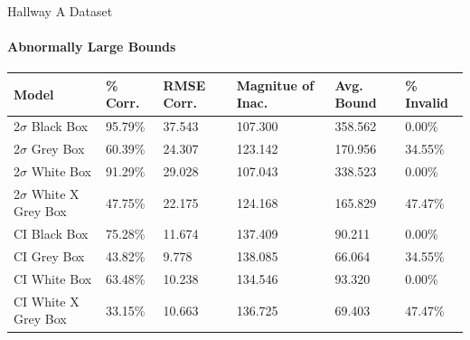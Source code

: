 \documentclass{beamer}
\begin{document}
\begin{frame}[t]{Hallway A Dataset}
  \framesubtitle{Abnormally Large Bounds}

  \vspace*{-0.5cm}
  \begin{table}[htp!]
  \small
  \begin{tabular}{|p{2.5cm}|p{1.3cm}|p{1.0cm}|p{1.7cm}|p{1.0cm}|p{1.5cm}|}

    \hline
    \textbf{Model} &
    \textbf{\% Corr.} &
    \textbf{RMSE Corr.} &
    \textbf{Magnitue of Inac.} &
    \textbf{Avg. Bound} &
    \textbf{\% Invalid} \\
    \hline

    2$\sigma$ Black Box &
    95.79\% &
    37.543 &
    107.300 &
    358.562 &
    0.00\% \\
    \hline

    2$\sigma$ Grey Box &
    60.39\% &
    24.307 &
    123.142 &
    170.956 &
    34.55\% \\
    \hline

    2$\sigma$ White Box &
    91.29\% &
    29.028 &
    107.043 &
    338.523 &
    0.00\% \\
    \hline

    2$\sigma$ White X Grey Box &
    47.75\% &
    22.175 &
    124.168 &
    165.829 &
    47.47\% \\
    \hline

    CI Black Box &
    75.28\% &
    11.674 &
    137.409 &
    90.211 &
    0.00\% \\
    \hline

    CI Grey Box &
    43.82\% &
    9.778 &
    138.085 &
    66.064 &
    34.55\% \\
    \hline

    CI White Box &
    63.48\% &
    10.238 &
    134.546 &
    93.320 &
    0.00\% \\
    \hline

    CI White X Grey Box &
    33.15\% &
    10.663 &
    136.725 &
    69.403 &
    47.47\% \\
    \hline



\end{tabular}
\end{table}

\end{frame}
\end{document}
